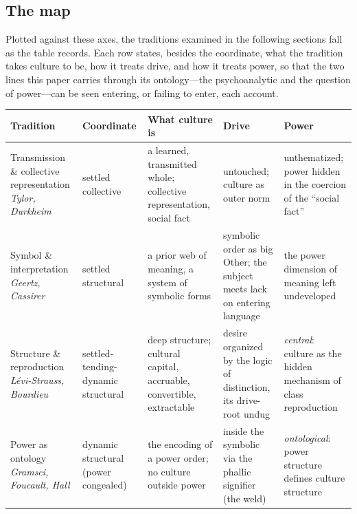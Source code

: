 \subsection*{The map}

Plotted against these axes, the traditions examined in the following sections fall as the table records. Each row states, besides the coordinate, what the tradition takes culture to be, how it treats drive, and how it treats power, so that the two lines this paper carries through its ontology---the psychoanalytic and the question of power---can be seen entering, or failing to enter, each account.

\begin{center}
\small
\renewcommand{\arraystretch}{1.45}
\begin{tabularx}{\linewidth}{@{}>{\RaggedRight\arraybackslash}p{2.5cm} >{\RaggedRight\arraybackslash}p{2.7cm} >{\RaggedRight\arraybackslash}X >{\RaggedRight\arraybackslash}p{2.5cm} >{\RaggedRight\arraybackslash}p{2.5cm}@{}}
\toprule
\textcolor{rosedeep}{\textbf{Tradition}} & \textcolor{rosedeep}{\textbf{Coordinate}} & \textcolor{rosedeep}{\textbf{What culture is}} & \textcolor{rosedeep}{\textbf{Drive}} & \textcolor{rosedeep}{\textbf{Power}} \\
\midrule
Transmission \& collective representation \newline\emph{\small Tylor, Durkheim} & settled \texttimes{} collective & a learned, transmitted whole; collective representation, social fact & untouched; culture as outer norm & unthematized; power hidden in the coercion of the ``social fact'' \\
Symbol \& interpretation \newline\emph{\small Geertz, Cassirer} & settled \texttimes{} structural & a prior web of meaning, a system of symbolic forms & symbolic order as big Other; the subject meets lack on entering language & the power dimension of meaning left undeveloped \\
Structure \& reproduction \newline\emph{\small L\'evi-Strauss, Bourdieu} & settled-tending-dynamic \texttimes{} structural & deep structure; cultural capital, accruable, convertible, extractable & desire organized by the logic of distinction, its drive-root undug & \emph{central}: culture as the hidden mechanism of class reproduction \\
Power as ontology \newline\emph{\small Gramsci, Foucault, Hall} & dynamic \texttimes{} structural (power congealed) & the encoding of a power order; no culture outside power & inside the symbolic via the phallic signifier (the weld) & \emph{ontological}: power structure defines culture structure \\

\end{tabularx}
\end{center}
